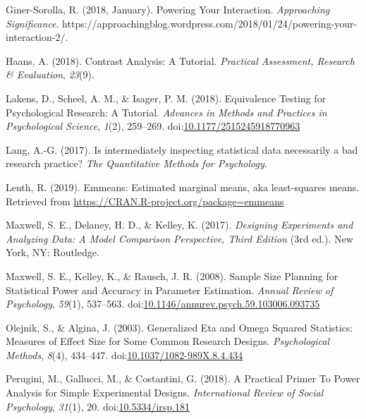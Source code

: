 \documentclass[
  ,jou,floatsintext]{apa6}
\begin{document}
\leavevmode\hypertarget{ref-giner-sorolla_powering_2018}{}%
Giner-Sorolla, R. (2018, January). Powering Your Interaction. \emph{Approaching Significance}. https://approachingblog.wordpress.com/2018/01/24/powering-your-interaction-2/.

\leavevmode\hypertarget{ref-haans_contrast_2018}{}%
Haans, A. (2018). Contrast Analysis: A Tutorial. \emph{Practical Assessment, Research \& Evaluation}, \emph{23}(9).

\leavevmode\hypertarget{ref-lakens_equivalence_2018}{}%
Lakens, D., Scheel, A. M., \& Isager, P. M. (2018). Equivalence Testing for Psychological Research: A Tutorial. \emph{Advances in Methods and Practices in Psychological Science}, \emph{1}(2), 259--269. doi:\href{https://doi.org/10.1177/2515245918770963}{10.1177/2515245918770963}

\leavevmode\hypertarget{ref-lang2017intermediately}{}%
Lang, A.-G. (2017). Is intermediately inspecting statistical data necessarily a bad research practice? \emph{The Quantitative Methods for Psychology}.

\leavevmode\hypertarget{ref-lenthemmeans}{}%
Lenth, R. (2019). Emmeans: Estimated marginal means, aka least-squares means. Retrieved from \url{https://CRAN.R-project.org/package=emmeans}

\leavevmode\hypertarget{ref-maxwell_designing_2017}{}%
Maxwell, S. E., Delaney, H. D., \& Kelley, K. (2017). \emph{Designing Experiments and Analyzing Data: A Model Comparison Perspective, Third Edition} (3rd ed.). New York, NY: Routledge.

\leavevmode\hypertarget{ref-maxwell_sample_2008}{}%
Maxwell, S. E., Kelley, K., \& Rausch, J. R. (2008). Sample Size Planning for Statistical Power and Accuracy in Parameter Estimation. \emph{Annual Review of Psychology}, \emph{59}(1), 537--563. doi:\href{https://doi.org/10.1146/annurev.psych.59.103006.093735}{10.1146/annurev.psych.59.103006.093735}

\leavevmode\hypertarget{ref-olejnik_generalized_2003}{}%
Olejnik, S., \& Algina, J. (2003). Generalized Eta and Omega Squared Statistics: Measures of Effect Size for Some Common Research Designs. \emph{Psychological Methods}, \emph{8}(4), 434--447. doi:\href{https://doi.org/10.1037/1082-989X.8.4.434}{10.1037/1082-989X.8.4.434}

\leavevmode\hypertarget{ref-perugini_practical_2018}{}%
Perugini, M., Gallucci, M., \& Costantini, G. (2018). A Practical Primer To Power Analysis for Simple Experimental Designs. \emph{International Review of Social Psychology}, \emph{31}(1), 20. doi:\href{https://doi.org/10.5334/irsp.181}{10.5334/irsp.181}
\end{document}
